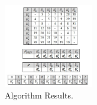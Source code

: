 \begin{figure}[h!]
\vspace{-10pt}
\begin{center}
\includegraphics[width=0.35\textwidth]{algo_example_3.jpg}
\caption{Algorithm Results.}
\label{fig:algo_example_3}
\end{center}
\vspace{-20pt}
\end{figure}
